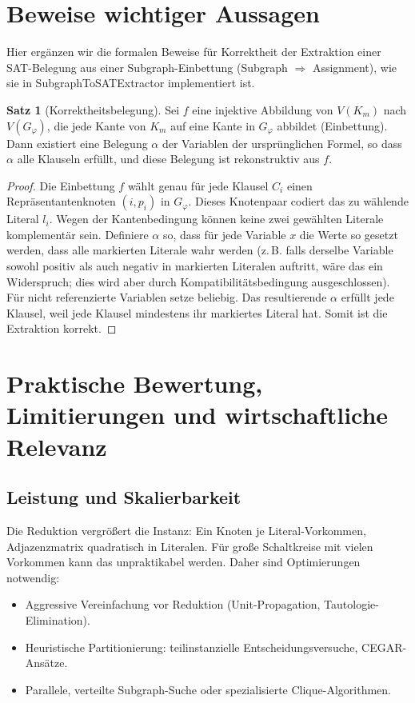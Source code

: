 \documentclass[a4paper,12pt]{article}
\theoremstyle{definition}
\newtheorem{satz}{Satz}[section]
\begin{document}
\section{Beweise wichtiger Aussagen}
\label{ch:proofs}

Hier ergänzen wir die formalen Beweise für Korrektheit der Extraktion einer SAT-Belegung aus einer Subgraph-Einbettung (Subgraph $\Rightarrow$ Assignment), wie sie in SubgraphToSATExtractor implementiert ist.

\begin{satz}[Korrektheitsbelegung]
Sei $f$ eine injektive Abbildung von $V(K_m)$ nach $V(G_\varphi)$, die jede Kante von $K_m$ auf eine Kante in $G_\varphi$ abbildet (Einbettung). Dann existiert eine Belegung $\alpha$ der Variablen der ursprünglichen Formel, so dass $\alpha$ alle Klauseln erfüllt, und diese Belegung ist rekonstruktiv aus $f$.
\end{satz}
\begin{proof}
Die Einbettung $f$ wählt genau für jede Klausel $C_i$ einen Repräsentantenknoten $(i,p_i)$ in $G_\varphi$. Dieses Knotenpaar codiert das zu wählende Literal $l_{i}$. Wegen der Kantenbedingung können keine zwei gewählten Literale komplementär sein. Definiere $\alpha$ so, dass für jede Variable $x$ die Werte so gesetzt werden, dass alle markierten Literale wahr werden (z.\,B. falls derselbe Variable sowohl positiv als auch negativ in markierten Literalen auftritt, wäre das ein Widerspruch; dies wird aber durch Kompatibilitätsbedingung ausgeschlossen). Für nicht referenzierte Variablen setze beliebig. Das resultierende $\alpha$ erfüllt jede Klausel, weil jede Klausel mindestens ihr markiertes Literal hat. Somit ist die Extraktion korrekt.
\end{proof}

\section{Praktische Bewertung, Limitierungen und wirtschaftliche Relevanz}
\label{ch:practical}

\subsection{Leistung und Skalierbarkeit}
Die Reduktion vergrößert die Instanz: Ein Knoten je Literal-Vorkommen, Adjazenzmatrix quadratisch in Literalen. Für große Schaltkreise mit vielen Vorkommen kann das unpraktikabel werden. Daher sind Optimierungen notwendig:
\begin{itemize}
  \item Aggressive Vereinfachung vor Reduktion (Unit-Propagation, Tautologie-Elimination).
  \item Heuristische Partitionierung: teilinstanzielle Entscheidungsversuche, CEGAR-Ansätze.
  \item Parallele, verteilte Subgraph-Suche oder spezialisierte Clique-Algorithmen.
\end{itemize}
\end{document}
